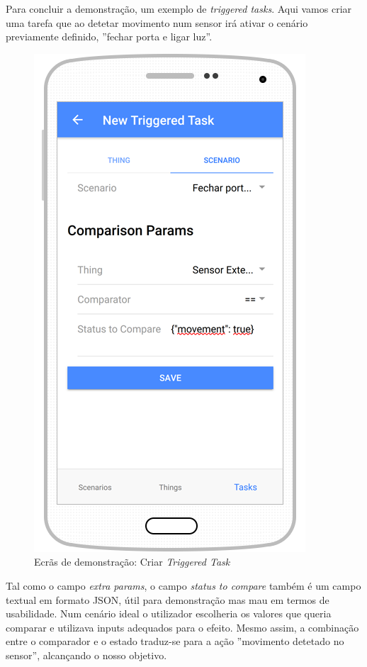 Para concluir a demonstração, um exemplo de \textit{triggered tasks}. Aqui vamos criar uma tarefa que ao detetar movimento num sensor irá ativar o cenário previamente definido, ''fechar porta e ligar luz''. 

\begin{figure}[H]
  \centering
        \includegraphics[scale=0.75]{img/demo/new_triggered_task.png}
  \caption{Ecrãs de demonstração: Criar \textit{Triggered Task}}
\end{figure}

Tal como o campo \textit{extra params}, o campo \textit{status to compare} também é um campo textual em formato JSON, útil para demonstração mas mau em termos de usabilidade. Num cenário ideal o utilizador escolheria os valores que queria comparar e utilizava inputs adequados para o efeito. Mesmo assim, a combinação entre o comparador e o estado traduz-se para a ação ''movimento detetado no sensor'', alcançando o nosso objetivo.

